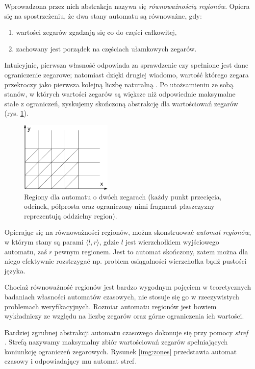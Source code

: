\documentclass{pracamgr}
\newcommand{\pair}[2]{\langle #1, #2 \rangle}
\theoremstyle{plain}
\begin{document}
Wprowadzona przez nich abstrakcja nazywa się \emph{równoważnością
  regionów}. Opiera się na spostrzeżeniu, że dwa stany automatu są
równoważne, gdy:
\begin{enumerate}
  \item wartości zegarów zgadzają się co do części całkowitej,
  \item zachowany jest porządek na częściach ułamkowych zegarów.
\end{enumerate}
Intuicyjnie, pierwsza własność odpowiada za sprawdzenie czy spełnione
jest dane ograniczenie zegarowe; natomiast dzięki drugiej wiadomo,
wartość którego zegara przekroczy jako pierwsza kolejną liczbę
naturalną \cite{am:decision}. Po utożsamieniu ze sobą stanów, w
których wartości zegarów są większe niż odpowiednie maksymalne stałe z
ograniczeń, zyskujemy skończoną abstrakcję dla wartościowań zegarów
(rys. \ref{img:regions}).
\begin{figure}[ht]
  \centering
  \includegraphics[width=0.4\textwidth]{img/ta-regions}
  \caption{Regiony dla automatu o dwóch zegarach (każdy punkt
    przecięcia, odcinek, półprosta oraz ograniczony nimi fragment
    płaszczyzny reprezentują oddzielny region).}
  \label{img:regions}
\end{figure}

Opierając się na równoważności regionów, można skonstruować
\emph{automat regionów}, w którym stany są parami $\pair{l}{r}$, gdzie
$l$ jest wierzchołkiem wyjściowego automatu, zaś $r$ pewnym
regionem. Jest to automat skończony, zatem można dla niego efektywnie
rozstrzygać np. problem osiągalności wierzchołka bądź pustości języka.

Chociaż równoważność regionów jest bardzo wygodnym pojęciem w
teoretycznych badaniach własności automatów czasowych, nie stosuje się
go w rzeczywistych problemach weryfikacyjnych. Rozmiar automatu
regionów jest bowiem wykładniczy ze względu na liczbę zegarów oraz
górne ograniczenia ich wartości.

Bardziej zgrubnej abstrakcji automatu czasowego dokonuje się przy
pomocy \emph{stref} \cite{henz-94}. Strefą nazywamy maksymalny zbiór
wartościowań zegarów spełniających koniunkcję ograniczeń zegarowych.
Rysunek \ref{img:zones} przedstawia automat czasowy i odpowiadający mu
automat stref.
\end{document}
